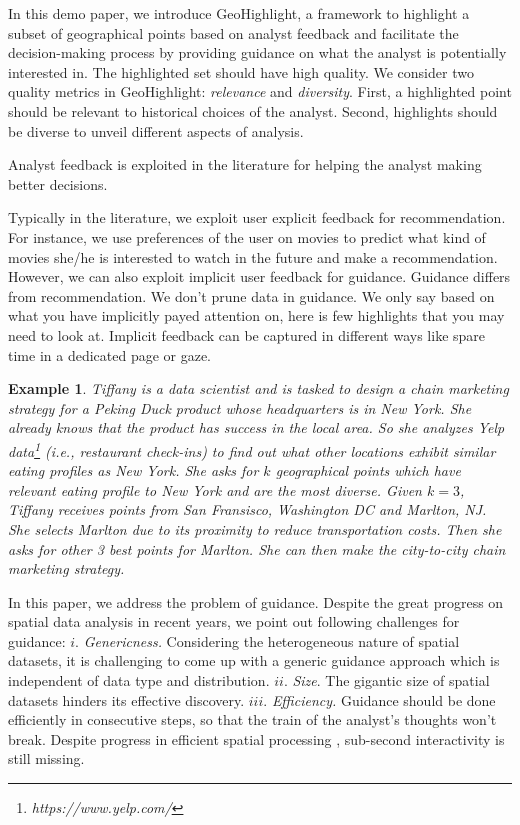 \documentclass{vldb}
\newtheorem{example}{Example}
\newcommand{\framework}{{\sc GeoHighlight}}
\begin{document}
In this demo paper, we introduce \framework, a framework to highlight a subset of geographical points based on analyst feedback and facilitate the decision-making process by providing guidance on what the analyst is potentially interested in. The highlighted set should have high quality. We consider two quality metrics in \framework: {\em relevance} and {\em diversity}. First, a highlighted point should be relevant to historical choices of the analyst. Second, highlights should be diverse to unveil different aspects of analysis.

Analyst feedback is exploited in the literature for helping the analyst making better decisions.

Typically in the literature, we exploit user explicit feedback for recommendation. For instance, we use preferences of the user on movies to predict what kind of movies she/he is interested to watch in the future and make a recommendation. However, we can also exploit implicit user feedback for guidance. Guidance differs from recommendation. We don't prune data in guidance. We only say based on what you have implicitly payed attention on, here is few highlights that you may need to look at. Implicit feedback can be captured in different ways like spare time in a dedicated page or gaze.



\begin{example}
\label{ex:flight}
Tiffany is a data scientist and is tasked to design a {\em chain marketing} strategy for a Peking Duck product whose headquarters is in New York. She already knows that the product has success in the local area. So she analyzes Yelp data\footnote{\it https://www.yelp.com/} (i.e., restaurant check-ins) to find out what other locations exhibit similar eating profiles as New York. She asks for $k$ geographical points which have relevant eating profile to New York and are the most diverse. Given $k=3$, Tiffany receives points from San Fransisco, Washington DC and Marlton, NJ. She selects Marlton due to its proximity to reduce transportation costs. Then she asks for other 3 best points for Marlton. She can then make the city-to-city chain marketing strategy.
\end{example}

In this paper, we address the problem of guidance. Despite the great progress on spatial data analysis in recent years, we point out following challenges for guidance:
$i.$ {\em Genericness.} Considering the heterogeneous nature of spatial datasets, it is challenging to come up with a generic guidance approach which is independent of data type and distribution.
$ii.$ {\em Size}. The gigantic size of spatial datasets hinders its effective discovery. 
$iii.$ {\em Efficiency.} Guidance should be done efficiently in consecutive steps, so that the train of the analyst's thoughts won't break. Despite progress in efficient spatial processing \cite{yu2015geospark}, sub-second interactivity is still missing.
\end{document}
